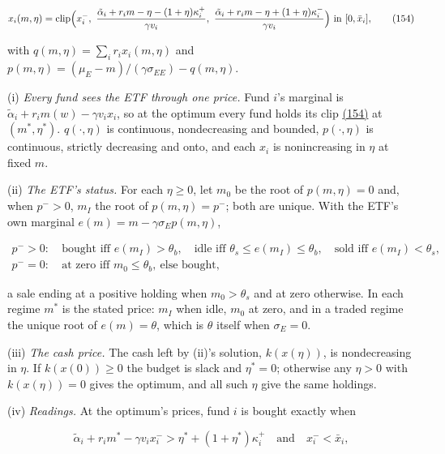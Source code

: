 \documentclass[11pt]{article}
\begin{document}
\begin{equation*}
x_i(m,\eta)=\mathrm{clip}\Bigl(x^-_i,\ \frac{\tilde\alpha_i+r_im-\eta-(1+\eta)\kappa^+_i}{\gamma v_i},\ \frac{\tilde\alpha_i+r_im-\eta+(1+\eta)\kappa^-_i}{\gamma v_i}\Bigr)\text{ in }[0,\bar x_i],\tag{154}\label{eq:154}
\end{equation*}

with \(q(m,\eta)=\sum_ir_ix_i(m,\eta)\) and \(p(m,\eta)=(\mu_E-m)/(\gamma\sigma_{EE})-q(m,\eta)\).

(i) \emph{Every fund sees the ETF through one price.} Fund \(i\)'s marginal is
\(\tilde\alpha_i+r_im(w)-\gamma v_ix_i\), so at the optimum every fund holds its clip
\hyperref[eq:154]{(154)} at \((m^*,\eta^*)\). \(q(\cdot,\eta)\) is continuous, nondecreasing and
bounded, \(p(\cdot,\eta)\) is continuous, strictly decreasing and onto, and each
\(x_i\) is nonincreasing in \(\eta\) at fixed \(m\).

(ii) \emph{The ETF's status.} For each \(\eta\geq0\), let \(m_0\) be the root of
\(p(m,\eta)=0\) and, when \(p^->0\), \(m_I\) the root of \(p(m,\eta)=p^-\); both are
unique. With the ETF's own marginal \(e(m)=m-\gamma\sigma_Ep(m,\eta)\),

\begin{equation*}
\begin{aligned}
p^->0:&\ \text{bought iff }e(m_I)>\theta_b,\quad\text{idle iff }\theta_s\leq e(m_I)\leq\theta_b,\quad\text{sold iff }e(m_I)<\theta_s,\\
p^-=0:&\ \text{at zero iff }m_0\leq\theta_b,\ \text{else bought},
\end{aligned}\tag{155}\label{eq:155}
\end{equation*}

a sale ending at a positive holding when \(m_0>\theta_s\) and at zero otherwise.
In each regime \(m^*\) is the stated price: \(m_I\) when idle, \(m_0\) at zero,
and in a traded regime the unique root of \(e(m)=\theta\), which is \(\theta\) itself
when \(\sigma_E=0\).

(iii) \emph{The cash price.} The cash left by (ii)'s solution,
\(k(x(\eta))\), is nondecreasing in \(\eta\). If \(k(x(0))\geq0\) the budget is slack and
\(\eta^*=0\); otherwise any \(\eta>0\) with \(k(x(\eta))=0\) gives the optimum, and all
such \(\eta\) give the same holdings.

(iv) \emph{Readings.} At the optimum's prices, fund \(i\) is bought exactly
when

\begin{equation*}
\tilde\alpha_i+r_im^*-\gamma v_ix^-_i>\eta^*+(1+\eta^*)\kappa^+_i\quad\text{and}\quad x^-_i<\bar x_i,\tag{156}\label{eq:156}
\end{equation*}
\end{document}
